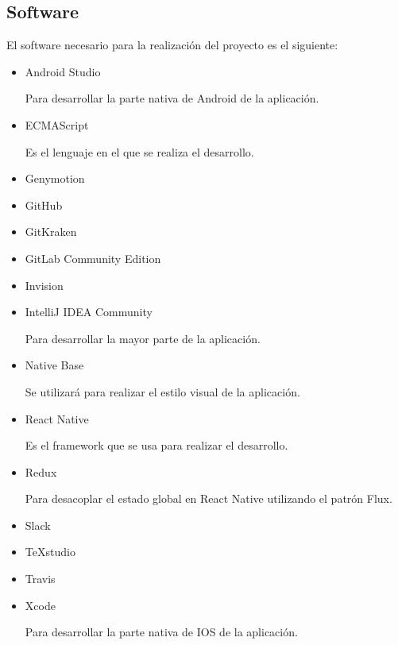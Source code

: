 \subsection{Software}

 El software necesario para la realización del proyecto es el siguiente:
\begin{itemize}
	\item Android Studio~\cite{ASTUDIO}
	
	Para desarrollar la parte nativa de Android de la aplicación.
	
	\item ECMAScript~\cite{ECMA}~\cite{ECMABOOK}
	
	Es el lenguaje en el que se realiza el desarrollo.
	
	\item Genymotion
	
	
	\item GitHub
	
	
	\item GitKraken
	
	
	\item GitLab Community Edition
	
	
	\item Invision
	
	
	\item IntelliJ IDEA Community~\cite{IDEA}
	
	Para desarrollar la mayor parte de la aplicación.
	
	\item Native Base~\cite{NABA}
	
	Se utilizará para realizar el estilo visual de la aplicación.
	
	\item React Native~\cite{RENA}~\cite{REACTBOOK}
	
	Es el framework que se usa para realizar el desarrollo.
	
	\item Redux~\cite{REDUX}
	
	Para desacoplar el estado global en React Native utilizando el patrón Flux.
	
	\item Slack
	
	
	\item TeXstudio
	
	
	\item Travis
	
	
	\item Xcode~\cite{XCODE}
	
	Para desarrollar la parte nativa de IOS de la aplicación.
\end{itemize}

